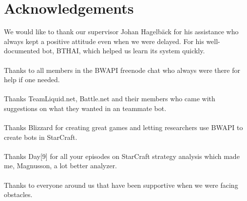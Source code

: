 \chapter*{Acknowledgements}
We would like to thank our supervisor Johan Hagelbäck for his assistance who always kept a
positive attitude even when we were delayed. For his well-documented bot, BTHAI, which helped us
learn its system quickly.
\\\\
Thanks to all members in the BWAPI freenode chat who always were there for help if one needed.
\\\\
Thanks TeamLiquid.net, Battle.net and their members who came with suggestions on what they wanted in an teammate
bot.
\\\\
Thanks Blizzard for creating great games and letting researchers use BWAPI to create bots in
StarCraft.
\\\\
Thanks Day[9] for all your episodes on StarCraft strategy analysis which made me, Magnusson, a lot
better analyzer.
\\\\
Thanks to everyone around us that have been supportive when we were facing obstacles.
